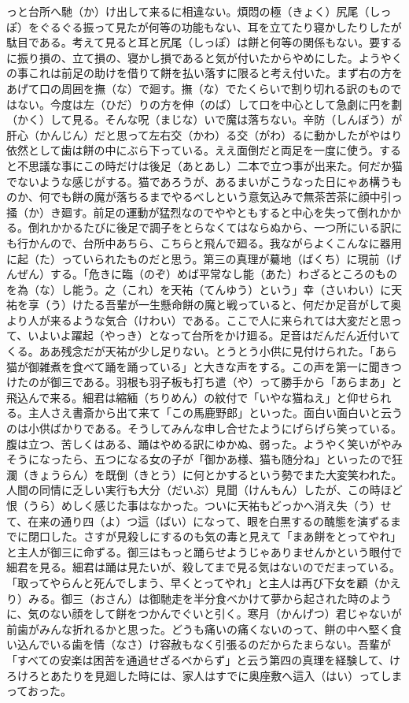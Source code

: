 っと台所へ馳（か）け出して来るに相違ない。煩悶の極（きょく）尻尾（しっぽ）をぐるぐる振って見たが何等の功能もない、耳を立てたり寝かしたりしたが駄目である。考えて見ると耳と尻尾（しっぽ）は餅と何等の関係もない。要するに振り損の、立て損の、寝かし損であると気が付いたからやめにした。ようやくの事これは前足の助けを借りて餅を払い落すに限ると考え付いた。まず右の方をあげて口の周囲を撫（な）で廻す。撫（な）でたくらいで割り切れる訳のものではない。今度は左（ひだ）りの方を伸（のば）して口を中心として急劇に円を劃（かく）して見る。そんな呪（まじな）いで魔は落ちない。辛防（しんぼう）が肝心（かんじん）だと思って左右交（かわ）る交（がわ）るに動かしたがやはり依然として歯は餅の中にぶら下っている。ええ面倒だと両足を一度に使う。すると不思議な事にこの時だけは後足（あとあし）二本で立つ事が出来た。何だか猫でないような感じがする。猫であろうが、あるまいがこうなった日にゃあ構うものか、何でも餅の魔が落ちるまでやるべしという意気込みで無茶苦茶に顔中引っ掻（か）き廻す。前足の運動が猛烈なのでややともすると中心を失って倒れかかる。倒れかかるたびに後足で調子をとらなくてはならぬから、一つ所にいる訳にも行かんので、台所中あちら、こちらと飛んで廻る。我ながらよくこんなに器用に起（た）っていられたものだと思う。第三の真理が驀地（ばくち）に現前（げんぜん）する。「危きに臨（のぞ）めば平常なし能（あた）わざるところのものを為（な）し能う。之（これ）を天祐（てんゆう）という」幸（さいわい）に天祐を享（う）けたる吾輩が一生懸命餅の魔と戦っていると、何だか足音がして奥より人が来るような気合（けわい）である。ここで人に来られては大変だと思って、いよいよ躍起（やっき）となって台所をかけ廻る。足音はだんだん近付いてくる。ああ残念だが天祐が少し足りない。とうとう小供に見付けられた。「あら猫が御雑煮を食べて踊を踊っている」と大きな声をする。この声を第一に聞きつけたのが御三である。羽根も羽子板も打ち遣（や）って勝手から「あらまあ」と飛込んで来る。細君は縮緬（ちりめん）の紋付で「いやな猫ねえ」と仰せられる。主人さえ書斎から出て来て「この馬鹿野郎」といった。面白い面白いと云うのは小供ばかりである。そうしてみんな申し合せたようにげらげら笑っている。腹は立つ、苦しくはある、踊はやめる訳にゆかぬ、弱った。ようやく笑いがやみそうになったら、五つになる女の子が「御かあ様、猫も随分ね」といったので狂瀾（きょうらん）を既倒（きとう）に何とかするという勢でまた大変笑われた。人間の同情に乏しい実行も大分（だいぶ）見聞（けんもん）したが、この時ほど恨（うら）めしく感じた事はなかった。ついに天祐もどっかへ消え失（う）せて、在来の通り四（よ）つ這（ばい）になって、眼を白黒するの醜態を演ずるまでに閉口した。さすが見殺しにするのも気の毒と見えて「まあ餅をとってやれ」と主人が御三に命ずる。御三はもっと踊らせようじゃありませんかという眼付で細君を見る。細君は踊は見たいが、殺してまで見る気はないのでだまっている。「取ってやらんと死んでしまう、早くとってやれ」と主人は再び下女を顧（かえり）みる。御三（おさん）は御馳走を半分食べかけて夢から起された時のように、気のない顔をして餅をつかんでぐいと引く。寒月（かんげつ）君じゃないが前歯がみんな折れるかと思った。どうも痛いの痛くないのって、餅の中へ堅く食い込んでいる歯を情（なさ）け容赦もなく引張るのだからたまらない。吾輩が「すべての安楽は困苦を通過せざるべからず」と云う第四の真理を経験して、けろけろとあたりを見廻した時には、家人はすでに奥座敷へ這入（はい）ってしまっておった。\\

